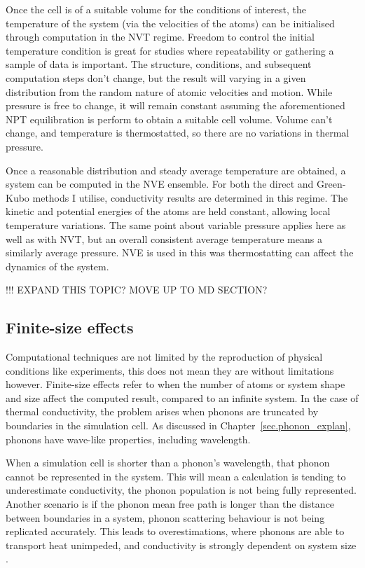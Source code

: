 Once the cell is of a suitable volume for the conditions of interest, the temperature of the system (via the velocities of the atoms) can be initialised through computation in the NVT regime. Freedom to control the initial temperature condition is great for studies where repeatability or gathering a sample of data is important. The structure, conditions, and subsequent computation steps don't change, but the result will varying in a given distribution from the random nature of atomic velocities and motion. While pressure is free to change, it will remain constant assuming the aforementioned NPT equilibration is perform to obtain a suitable cell volume. Volume can't change, and temperature is thermostatted, so there are no variations in thermal pressure.

Once a reasonable distribution and steady average temperature are obtained, a system can be computed in the NVE ensemble. For both the direct and Green-Kubo methods I utilise, conductivity results are determined in this regime. The kinetic and potential energies of the atoms are held constant, allowing local temperature variations. The same point about variable pressure applies here as well as with NVT, but an overall consistent average temperature means a similarly average pressure. NVE is used in this was thermostatting can affect the dynamics of the system.

!!! EXPAND THIS TOPIC? MOVE UP TO MD SECTION?









\subsection{Finite-size effects}

Computational techniques are not limited by the reproduction of physical conditions like experiments, this does not mean they are without limitations however. Finite-size effects refer to when the number of atoms or system shape and size affect the computed result, compared to an infinite system. In the case of thermal conductivity, the problem arises when phonons are truncated by boundaries in the simulation cell. As discussed in Chapter~\ref{sec.phonon_explan}, phonons have wave-like properties, including wavelength. 

When a simulation cell is shorter than a phonon's wavelength, that phonon cannot be represented in the system. This will mean a calculation is tending to underestimate conductivity, the phonon population is not being fully represented. Another scenario is if the phonon mean free path is longer than the distance between boundaries in a system, phonon scattering behaviour is not being replicated accurately. This leads to overestimations, where phonons are able to transport heat unimpeded, and conductivity is strongly dependent on system size \citep{Tadano2014}. 

